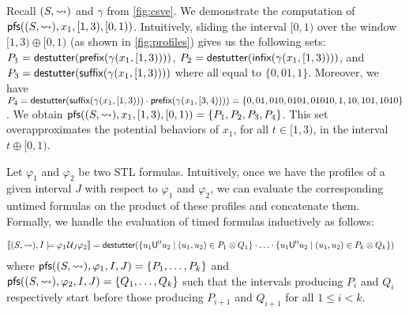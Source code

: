 \begin{example} \label{ex:profiles}
	Recall $(S, {\rightsquigarrow})$ and $\gamma$ from \cref{fig:csve}.
	We demonstrate the computation of $\mathsf{pfs}((S,{\rightsquigarrow}), x_1, [1,3), [0,1))$.
	Intuitively, sliding the interval $[0,1)$ over the window $[1,3) \oplus [0,1)$ (as shown in \cref{fig:profiles}) gives us the following sets:
	$P_1 = \mathsf{destutter}(\textsf{prefix}(\gamma(x_1, [1,3))))$,
	$P_2 = \mathsf{destutter}(\textsf{infix}(\gamma(x_1, [1,3))))$, and
	$P_3 = \mathsf{destutter}(\textsf{suffix}(\gamma(x_1, [1,3))))$  where all equal to $\{ 0, 01, 1 \}$.
	Moreover, we have $P_4 = \mathsf{destutter}(\textsf{suffix}(\gamma(x_1, [1,3))) \cdot \textsf{prefix}(\gamma(x_1, [3,4)))) = \{ 0, 01, 010, 0101, 01010, 1, 10, 101, 1010 \}$.
	We obtain $\mathsf{pfs}((S,{\rightsquigarrow}), x_1, [1,3), [0,1)) = \{P_1, P_2, P_3, P_4\}$.
	This set overapproximates the potential behaviors of $x_1$, for all $t \in [1,3)$, in the interval $t \oplus [0,1)$.
\end{example}



Let $\varphi_1$ and $\varphi_2$ be two STL formulas.
Intuitively, once we have the profiles of a given interval $J$ with respect to $\varphi_1$ and $\varphi_2$, we can evaluate the corresponding untimed formulas on the product of these profiles and concatenate them.
Formally, we handle the evaluation of timed formulas inductively as follows:

\scriptsize
\begin{align*}
	\llbracket (S, {\hb}), I \models \varphi_1 \until_J \varphi_2 \rrbracket &= \destutter( \{ u_1 \mathsf{U}^0 u_2 \st (u_1, u_2) \in P_1 \otimes Q_1 \} \cdot \ldots \cdot \{ u_1 \mathsf{U}^0 u_2 \st (u_1, u_2) \in P_k \otimes Q_k \} )
\end{align*}
\normalsize
where $\mathsf{pfs}((S,{\rightsquigarrow}), \varphi_1, I, J) = \{P_1, \ldots, P_k \}$ and $\mathsf{pfs}((S,{\rightsquigarrow}), \varphi_2, I, J) = \{Q_1, \ldots, Q_k \}$ such that the intervals producing $P_i$ and $Q_i$ respectively start before those producing $P_{i+1}$ and $Q_{i+1}$ for all $1 \leq i < k$.

